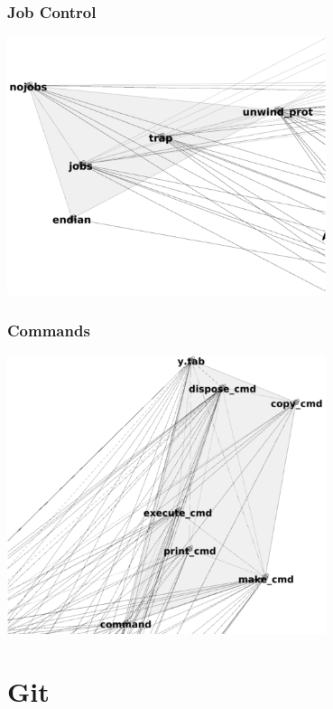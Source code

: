 \documentclass[xetex,mathserif,serif]{beamer}
\begin{document}
    \begin{frame}
        \frametitle{Job Control}
        \begin{center}
            \includegraphics[width=0.7\textwidth]{bashJobControl.png}
        \end{center}
    \end{frame}

    \begin{frame}
        \frametitle{Commands}
        \begin{center}
            \includegraphics[width=0.7\textwidth]{bashCommands.png}
        \end{center}
    \end{frame}

    \section{Git}
\end{document}
